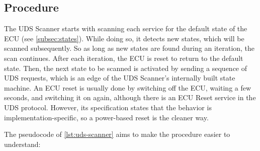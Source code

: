 \subsection{Procedure}

The UDS Scanner starts with scanning each service for the default state of the ECU (see \autoref{subsec:states}). While doing so, it detects new states, which will be scanned subsequently. So as long as new states are found during an iteration, the scan continues. After each iteration, the ECU is reset to return to the default state. Then, the next state to be scanned is activated by sending a sequence of UDS requests, which is an edge of the UDS Scanner's internally built state machine. An ECU reset is usually done by switching off the ECU, waiting a few seconds, and switching it on again, although there is an ECU Reset service in the UDS protocol. However, its specification states that the behavior is implementation-specific, so a power-based reset is the cleaner way.

The pseudocode of \autoref{lst:uds-scanner} aims to make the procedure easier to understand:

